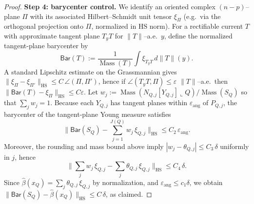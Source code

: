 \documentclass[11pt]{article}
\newcommand{\REVMZ}[1]{\textcolor{teal}{#1}}  %
\numberwithin{equation}{section}  %
\theoremstyle{plain}
\theoremstyle{definition}
\theoremstyle{remark}
\DeclareMathOperator{\Mass}{Mass}
\begin{document}
\begin{proof}
{\noindent\textbf{Step 4: barycenter control.}}
{We identify an oriented complex $(n-p)$--plane $\Pi$ with its associated Hilbert--Schmidt unit tensor $\xi_{\Pi}$
(e.g.\ via the orthogonal projection onto $\Pi$, normalized in $\mathrm{HS}$ norm).
For a rectifiable current $T$ with approximate tangent plane $T_yT$ for $\|T\|$--a.e.\ $y$, define the normalized
tangent-plane barycenter by
\[
\mathsf{Bar}(T):=\frac{1}{\Mass(T)}\int \xi_{T_yT}\,d\|T\|(y).
\]
A standard Lipschitz estimate on the Grassmannian \REVMZ{\cite{GH78}} gives $\|\xi_{\Pi}-\xi_{\Pi'}\|_{\mathrm{HS}}\le C\,\angle(\Pi,\Pi')$,
hence if $\angle(T_yT,\Pi)\le \varepsilon$ $\|T\|$--a.e.\ then $\|\mathsf{Bar}(T)-\xi_\Pi\|_{\mathrm{HS}}\le C\varepsilon$.}
Let $w_j:=\Mass(N_{Q,j}[Y_{Q,j}]\llcorner Q)/\Mass(S_Q)$ so that $\sum_j w_j=1$.
Because each $Y_{Q,j}$ has tangent planes within $\varepsilon_{\mathrm{ang}}$ of $P_{Q,j}$,
the barycenter of the tangent-plane Young measure satisfies
\[
\bigl\|\mathsf{Bar}(S_Q)-\sum_{j=1}^{J(Q)} w_j\,\xi_{Q,j}\bigr\|_{\mathrm{HS}}
\le C_2\,\varepsilon_{\mathrm{ang}}.
\]
Moreover, the rounding and mass bound above imply $|w_j-\theta_{Q,j}|\le C_3\,\delta$ uniformly in $j$,
hence
\[
\bigl\|\sum_j w_j\,\xi_{Q,j}-\sum_j\theta_{Q,j}\,\xi_{Q,j}\bigr\|_{\mathrm{HS}}
\le C_4\,\delta.
\]
Since $\widehat\beta(x_Q)=\sum_j\theta_{Q,j}\,\xi_{Q,j}$ by normalization, and $\varepsilon_{\mathrm{ang}}\le c_1\delta$,
we obtain $\|\mathsf{Bar}(S_Q)-\widehat\beta(x_Q)\|_{\mathrm{HS}}\le C\,\delta$, as claimed.
\end{proof}

\end{document}
